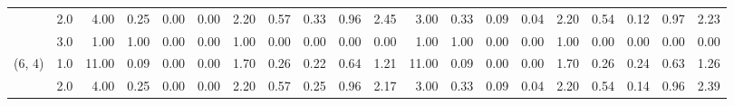 \begin{tabular}{llrrrrrrrrrrrrrrrrrr}
       & 2.0 &               4.00 &                     0.25 &                                 0.00 &                             0.00 &                           2.20 &                                               0.57 &                                            0.33 &                                            0.96 &                                        2.45 &               3.00 &                     0.33 &                                 0.09 &                             0.04 &                           2.20 &                                               0.54 &                                            0.12 &                                            0.97 &                                        2.23 \\
       & 3.0 &               1.00 &                     1.00 &                                 0.00 &                             0.00 &                           1.00 &                                               0.00 &                                            0.00 &                                            0.00 &                                        0.00 &               1.00 &                     1.00 &                                 0.00 &                             0.00 &                           1.00 &                                               0.00 &                                            0.00 &                                            0.00 &                                        0.00 \\
(6, 4) & 1.0 &              11.00 &                     0.09 &                                 0.00 &                             0.00 &                           1.70 &                                               0.26 &                                            0.22 &                                            0.64 &                                        1.21 &              11.00 &                     0.09 &                                 0.00 &                             0.00 &                           1.70 &                                               0.26 &                                            0.24 &                                            0.63 &                                        1.26 \\
       & 2.0 &               4.00 &                     0.25 &                                 0.00 &                             0.00 &                           2.20 &                                               0.57 &                                            0.25 &                                            0.96 &                                        2.17 &               3.00 &                     0.33 &                                 0.09 &                             0.04 &                           2.20 &                                               0.54 &                                            0.14 &                                            0.96 &                                        2.39 \\

\end{tabular}
